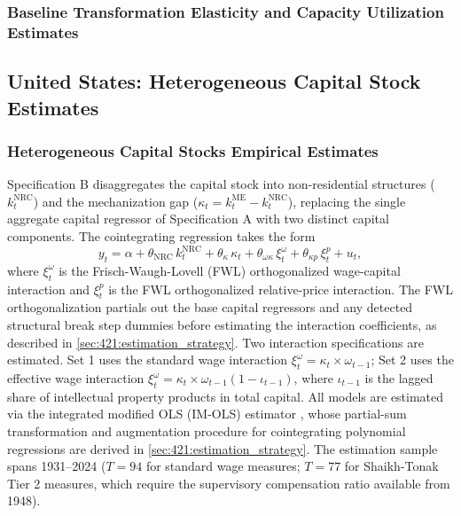 



\subsubsection{Baseline Transformation Elasticity and Capacity Utilization Estimates}

\subsection{United States: Heterogeneous Capital Stock Estimates}

\subsubsection{Heterogeneous Capital Stocks Empirical Estimates}
\label{sec:431:specB_results}

Specification B disaggregates the capital stock into non-residential
structures ($k^{\text{NRC}}_t$) and the mechanization gap
($\kappa_t = k^{\text{ME}}_t - k^{\text{NRC}}_t$), replacing the
single aggregate capital regressor of Specification A with two
distinct capital components. The cointegrating regression takes the
form
\begin{equation}
	y_t = \alpha + \theta_{\text{NRC}}\, k^{\text{NRC}}_t
	+ \theta_{\kappa}\, \kappa_t
	+ \theta_{\omega\kappa}\, \xi^{\omega}_t
	+ \theta_{\kappa p}\, \xi^{p}_t
	+ u_t,
	\label{eq:431:specB_model}
\end{equation}
where $\xi^{\omega}_t$ is the Frisch-Waugh-Lovell (FWL)
orthogonalized wage-capital interaction and $\xi^{p}_t$ is the FWL
orthogonalized relative-price interaction. The FWL orthogonalization
partials out the base capital regressors and any detected structural
break step dummies before estimating the interaction coefficients,
as described in \cref{sec:421:estimation_strategy}. Two interaction
specifications are estimated. Set 1 uses the standard wage
interaction $\xi^{\omega}_t = \kappa_t \times \omega_{t-1}$; Set 2
uses the effective wage interaction $\xi^{\omega}_t = \kappa_t
\times \omega_{t-1}(1 - \iota_{t-1})$, where $\iota_{t-1}$ is the
lagged share of intellectual property products in total capital. All
models are estimated via the integrated modified OLS (IM-OLS)
estimator \citep{VogelsangWagner2014}, whose partial-sum
transformation and augmentation procedure for cointegrating
polynomial regressions are derived in
\cref{sec:421:estimation_strategy}. The estimation sample spans
1931--2024 ($T = 94$ for standard wage measures; $T = 77$ for
Shaikh-Tonak Tier 2 measures, which require the supervisory
compensation ratio available from 1948).

